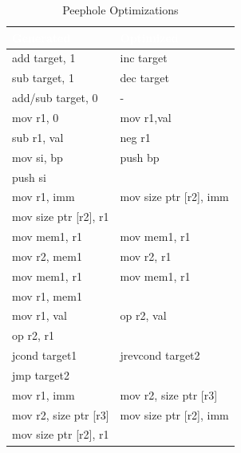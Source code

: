 \documentclass[12pt]{article}
\begin{document}
\begin{table}
\centering
\begin{tabular}{|l|l|}
\hline
   \rowcolor{ablack}
    \textcolor{white}{Generated} & \textcolor{white}{Optimized} \\ \hline
    
    \rowcolor{gray}
    add target, 1 & inc target \\ 
    
    sub target, 1 & dec target \\ 

	\rowcolor{gray}   
    add/sub target, 0 & - \\ 
    
    mov r1, 0 & mov r1,val\\ 
    sub r1, val & neg r1 \\  
       
    \rowcolor{gray}  
    mov si, bp & push bp \\ 
    \rowcolor{gray}    
    push si & \\
    
    mov r1, imm  & mov  size ptr [r2], imm \\ 
    mov size ptr [r2], r1 & \\  
    
    \rowcolor{gray}
    mov mem1, r1 & mov mem1, r1 \\ 
    \rowcolor{gray}
    mov r2, mem1 & mov r2, r1 \\ 
    
    mov mem1, r1 & mov mem1, r1 \\ 
    mov r1, mem1 & \\ 

    \rowcolor{gray}
    mov r1, val & op r2, val \\
    \rowcolor{gray} 
    op r2, r1  & \\ 

    jcond target1  & jrevcond target2 \\ 
    jmp target2 & \\ 

    \rowcolor{gray}
    mov r1, imm & mov r2, size ptr [r3] \\
    \rowcolor{gray}
    mov r2, size ptr [r3] & mov  size ptr [r2], imm \\
    \rowcolor{gray}
    mov size ptr [r2], r1 & \\
    
\hline
\end{tabular}
\caption{Peephole Optimizations}
\end{table}
\end{document}
